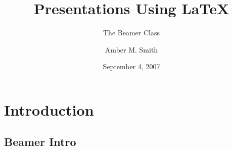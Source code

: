 \documentclass[compress,red]{beamer}
\title{Presentations Using \LaTeX}
\subtitle{The Beamer Class}
\author{Amber M. Smith}
\institute{Department of Mathematics\\ University of Utah \\ \vspace{.25cm}GSAC Colloquium}
\date{September 4, 2007}
\begin{document}

\frame{
	\titlepage 
}



\section{Introduction}
\subsection{Beamer Intro}


\end{document}
